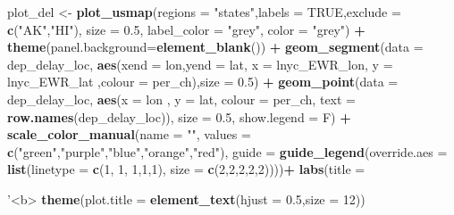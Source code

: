\documentclass[
]{article}
\newenvironment{Shaded}{\begin{snugshade}}{\end{snugshade}}
\newcommand{\DataTypeTok}[1]{\textcolor[rgb]{0.13,0.29,0.53}{#1}}
\newcommand{\DecValTok}[1]{\textcolor[rgb]{0.00,0.00,0.81}{#1}}
\newcommand{\FloatTok}[1]{\textcolor[rgb]{0.00,0.00,0.81}{#1}}
\newcommand{\KeywordTok}[1]{\textcolor[rgb]{0.13,0.29,0.53}{\textbf{#1}}}
\newcommand{\NormalTok}[1]{#1}
\newcommand{\OperatorTok}[1]{\textcolor[rgb]{0.81,0.36,0.00}{\textbf{#1}}}
\newcommand{\OtherTok}[1]{\textcolor[rgb]{0.56,0.35,0.01}{#1}}
\newcommand{\StringTok}[1]{\textcolor[rgb]{0.31,0.60,0.02}{#1}}
\begin{document}
\begin{Shaded}
\begin{Highlighting}[]
{{{{\NormalTok{plot_del <-}\StringTok{ }\KeywordTok{plot_usmap}\NormalTok{(}\DataTypeTok{regions =} \StringTok{"states"}\NormalTok{,}\DataTypeTok{labels =} \OtherTok{TRUE}\NormalTok{,}\DataTypeTok{exclude =}  \KeywordTok{c}\NormalTok{(}\StringTok{"AK"}\NormalTok{,}\StringTok{"HI"}\NormalTok{), }\DataTypeTok{size =} \FloatTok{0.5}\NormalTok{,}
           \DataTypeTok{label_color =} \StringTok{"grey"}\NormalTok{,}
           \DataTypeTok{color =} \StringTok{"grey"}\NormalTok{) }\OperatorTok{+}\StringTok{ }
\StringTok{    }\KeywordTok{theme}\NormalTok{(}\DataTypeTok{panel.background=}\KeywordTok{element_blank}\NormalTok{()) }\OperatorTok{+}
\StringTok{  }\KeywordTok{geom_segment}\NormalTok{(}\DataTypeTok{data =}\NormalTok{ dep_delay_loc,}
               \KeywordTok{aes}\NormalTok{(}\DataTypeTok{xend =}\NormalTok{ lon,}\DataTypeTok{yend =}\NormalTok{ lat, }\DataTypeTok{x =}\NormalTok{ lnyc_EWR_lon,}
                                         \DataTypeTok{y =}\NormalTok{ lnyc_EWR_lat ,}\DataTypeTok{colour =}\NormalTok{ per_ch),}\DataTypeTok{size =} \FloatTok{0.5}\NormalTok{) }\OperatorTok{+}\StringTok{ }
\StringTok{  }\KeywordTok{geom_point}\NormalTok{(}\DataTypeTok{data =}\NormalTok{ dep_delay_loc,}
             \KeywordTok{aes}\NormalTok{(}\DataTypeTok{x =}\NormalTok{ lon , }\DataTypeTok{y =}\NormalTok{ lat, }\DataTypeTok{colour =}\NormalTok{  per_ch,}
                 \DataTypeTok{text =} \KeywordTok{row.names}\NormalTok{(dep_delay_loc)),}
             \DataTypeTok{size =} \FloatTok{0.5}\NormalTok{, }\DataTypeTok{show.legend =}\NormalTok{ F) }\OperatorTok{+}
\StringTok{  }\KeywordTok{scale_color_manual}\NormalTok{(}\DataTypeTok{name =} \StringTok{""}\NormalTok{,}
                     \DataTypeTok{values =} \KeywordTok{c}\NormalTok{(}\StringTok{"green"}\NormalTok{,}\StringTok{"purple"}\NormalTok{,}\StringTok{"blue"}\NormalTok{,}\StringTok{"orange"}\NormalTok{,}\StringTok{"red"}\NormalTok{),}
                     \DataTypeTok{guide =}  \KeywordTok{guide_legend}\NormalTok{(}\DataTypeTok{override.aes =} \KeywordTok{list}\NormalTok{(}\DataTypeTok{linetype =} \KeywordTok{c}\NormalTok{(}\DecValTok{1}\NormalTok{, }\DecValTok{1}\NormalTok{, }\DecValTok{1}\NormalTok{,}\DecValTok{1}\NormalTok{,}\DecValTok{1}\NormalTok{), }
                                          \DataTypeTok{size =} \KeywordTok{c}\NormalTok{(}\DecValTok{2}\NormalTok{,}\DecValTok{2}\NormalTok{,}\DecValTok{2}\NormalTok{,}\DecValTok{2}\NormalTok{,}\DecValTok{2}\NormalTok{))))}\OperatorTok{+}
\StringTok{    }\KeywordTok{labs}\NormalTok{(}\DataTypeTok{title =} \StringTok{'<b>% of Flight Departures Delayed > 15 Min</b><br> Airport = JFK Year = 2013<br><br><br><br><br><br><br><br><br><br><br><br><br><br><br><br><br><br><br> Click line endpoint to see that airports departures'}\NormalTok{) }\OperatorTok{+}
\StringTok{      }\KeywordTok{theme}\NormalTok{(}\DataTypeTok{plot.title =} \KeywordTok{element_text}\NormalTok{(}\DataTypeTok{hjust =} \FloatTok{0.5}\NormalTok{,}\DataTypeTok{size =} \DecValTok{12}\NormalTok{))}

}}}}}
\end{Highlighting}
\end{Shaded}
\end{document}

